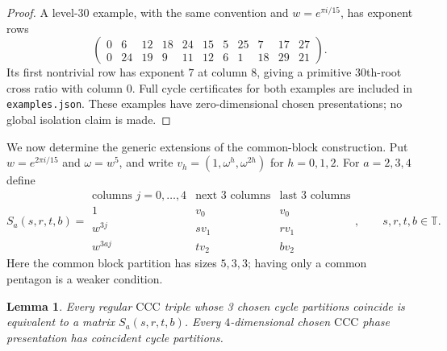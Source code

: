 \documentclass[11pt,a4paper]{article}
\newtheorem{lemma}[theorem]{Lemma}
\theoremstyle{plain}
\theoremstyle{definition}
\theoremstyle{plain}
\begin{document}
\begin{proof}
A level-$30$ example, with the same convention and $w=e^{\pi i/15}$, has exponent rows
$$\begin{pmatrix}
0&6&12&18&24&15&5&25&7&17&27\\
0&24&19&9&11&12&6&1&18&29&21
\end{pmatrix}.$$
Its first nontrivial row has exponent $7$ at column $8$, giving a primitive $30$th-root cross ratio with column $0$. Full cycle certificates for both examples are included in \texttt{examples.json}. These examples have zero-dimensional chosen presentations; no global isolation claim is made.
\end{proof}

\medskip
We now determine the generic extensions of the common-block construction. Put $w=e^{2\pi i/15}$ and $\omega=w^5$, and write $v_h=(1,\omega^h,\omega^{2h})$ for $h=0,1,2$. For $a=2,3,4$ define
\[
S_a(s,r,t,b)=
\begin{array}{c|c|c}
\text{columns }j=0,\ldots,4&\text{next 3 columns}&\text{last 3 columns}\\\hline
1&v_0&v_0\\
w^{3j}&s v_1&r v_1\\
w^{3aj}&t v_2&b v_2
\end{array},\qquad s,r,t,b\in\mathbb T.
\]
Here the common block partition has sizes $5,3,3$; having only a common pentagon is a weaker condition.

\par\addvspace{\medskipamount}\noindent
\begin{minipage}{\linewidth}
\begin{lemma}\label{ccc_common:normal}
Every regular $\mathrm{CCC}$ triple whose 3 chosen cycle partitions coincide is equivalent to a matrix $S_a(s,r,t,b)$. Every $4$-dimensional chosen $\mathrm{CCC}$ phase presentation has coincident cycle partitions.
\end{lemma}
\end{minipage}
\par\addvspace{\medskipamount}
\end{document}
